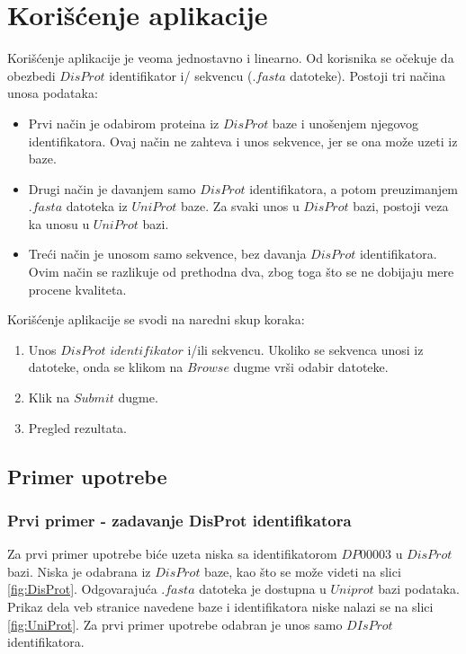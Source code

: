 \section{Korišćenje aplikacije}
Korišćenje aplikacije je veoma jednostavno i linearno. Od korisnika se očekuje da obezbedi $DisProt$ identifikator i/ sekvencu ($.fasta$ datoteke). Postoji tri načina unosa podataka:
\begin{itemize}
\item Prvi način je odabirom proteina iz $DisProt$ baze i unošenjem njegovog identifikatora. Ovaj način ne zahteva i unos sekvence, jer se ona može uzeti iz baze.
\item Drugi način je davanjem samo $DisProt$ identifikatora, a potom preuzimanjem $.fasta$ datoteka iz $UniProt$ baze. Za svaki unos u $DisProt$ bazi, postoji veza ka unosu u $UniProt$ bazi. 
\item Treći način je unosom samo sekvence, bez davanja $DisProt$ identifikatora. Ovim način se razlikuje od prethodna dva, zbog toga što se ne dobijaju mere procene kvaliteta.
\end{itemize} 
Korišćenje aplikacije se svodi na naredni skup koraka:
\begin{enumerate}
\item Unos $DisProt$ $identifikator$ i/ili sekvencu. Ukoliko se sekvenca unosi iz datoteke, onda se klikom na $Browse$ dugme vrši odabir datoteke.
\item Klik na $Submit$ dugme.
\item Pregled rezultata.
\end{enumerate}

\subsection{Primer upotrebe}
\subsubsection{Prvi primer - zadavanje DisProt identifikatora}
Za prvi primer upotrebe biće uzeta niska sa identifikatorom $DP00003$ u $DisProt$ bazi. 
Niska je odabrana iz $DisProt$ baze, kao što se može videti na slici \ref{fig:DisProt}. Odgovarajuća $.fasta$ datoteka je dostupna u $Uniprot$ bazi podataka. Prikaz dela veb stranice navedene baze i identifikatora niske nalazi se na slici \ref{fig:UniProt}. Za prvi primer upotrebe odabran je unos samo $DIsProt$ identifikatora.

